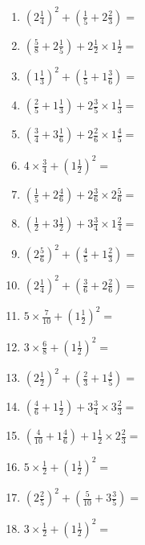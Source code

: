 \documentclass[12pt]{article}
\begin{document}
\begin{enumerate}
\item \large $ (2 \frac{1}{4})^2 + (\frac{1}{5} + 2 \frac{2}{3}) = $ \vspace{1.8cm}
\item \large $ (\frac{5}{8} + 2 \frac{1}{5}) + 2 \frac{1}{2} \times 1 \frac{1}{2} = $ \vspace{1.8cm}
\item \large $ (1 \frac{1}{3})^2 + (\frac{1}{5} + 1 \frac{3}{6}) = $ \vspace{1.8cm}
\item \large $ (\frac{2}{5} + 1 \frac{1}{3}) + 2 \frac{3}{5} \times 1 \frac{1}{3} = $ \vspace{1.8cm}
\item \large $ (\frac{3}{4} + 3 \frac{1}{6}) + 2 \frac{2}{6} \times 1 \frac{4}{5} = $ \vspace{1.8cm}
\item \large $ 4 \times \frac{3}{4} + (1 \frac{1}{2})^2 = $ \vspace{1.8cm}
\item \large $ (\frac{1}{5} + 2 \frac{4}{6}) + 2 \frac{3}{6} \times 2 \frac{5}{6} = $ \vspace{1.8cm}
\item \large $ (\frac{1}{2} + 3 \frac{1}{2}) + 3 \frac{3}{4} \times 1 \frac{2}{4} = $ \vspace{1.8cm}
\newpage
\item \large $ (2 \frac{5}{6})^2 + (\frac{4}{5} + 1 \frac{2}{3}) = $ \vspace{1.8cm}
\item \large $ (2 \frac{1}{4})^2 + (\frac{3}{6} + 2 \frac{2}{6}) = $ \vspace{1.8cm}
\item \large $ 5 \times \frac{7}{10} + (1 \frac{1}{2})^2 = $ \vspace{1.8cm}
\item \large $ 3 \times \frac{6}{8} + (1 \frac{1}{2})^2 = $ \vspace{1.8cm}
\item \large $ (2 \frac{1}{2})^2 + (\frac{2}{3} + 1 \frac{4}{5}) = $ \vspace{1.8cm}
\item \large $ (\frac{4}{6} + 1 \frac{1}{2}) + 3 \frac{3}{4} \times 3 \frac{2}{3} = $ \vspace{1.8cm}
\item \large $ (\frac{4}{10} + 1 \frac{4}{6}) + 1 \frac{1}{2} \times 2 \frac{2}{3} = $ \vspace{1.8cm}
\item \large $ 5 \times \frac{1}{2} + (1 \frac{1}{2})^2 = $ \vspace{1.8cm}
\item \large $ (2 \frac{2}{5})^2 + (\frac{5}{10} + 3 \frac{3}{5}) = $ \vspace{1.8cm}
\item \large $ 3 \times \frac{1}{2} + (1 \frac{1}{2})^2 = $ \vspace{1.8cm}
\end{enumerate}\newpage
\end{document}

